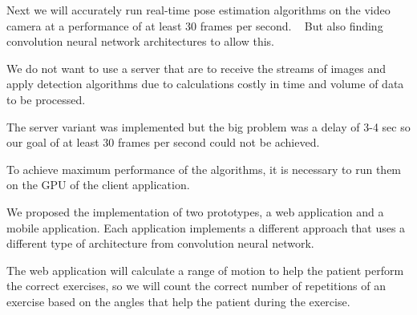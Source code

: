 Next we will accurately run real-time pose estimation algorithms on the video camera at a performance of at least 30 frames per second.
  But also finding convolution neural network architectures to allow this.

We do not want to use a server that are to receive the streams of images 
and apply detection algorithms due to calculations costly in time and volume of data to be processed.

The server variant was implemented but the big problem 
was a delay of 3-4 sec so our goal of at least 30 frames per second could not be achieved.


To achieve maximum performance of the algorithms, 
it is necessary to run them on the GPU of the client application. 

 We proposed the implementation of two prototypes, a web application and a mobile application.
Each application implements a different approach that uses a different type of architecture from convolution neural network.

The web application will calculate a range of motion to help the patient perform the correct exercises, so we will count the correct number of repetitions of an exercise based on the angles that help the patient during the exercise.



